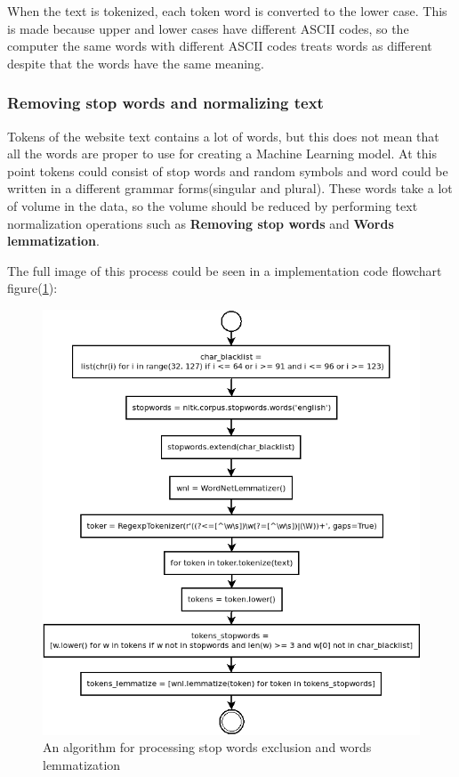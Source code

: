 When the text is tokenized, each token word is converted to the lower case. This is made because upper and lower cases have different ASCII codes, so the computer the same words with different ASCII codes treats words as different despite that the words have the same meaning.

\subsubsection{Removing stop words and normalizing text}

\label{sec:stopWords}

Tokens of the website text contains a lot of words, but this does not mean that all the words are proper to use for creating a Machine Learning model. At this point tokens could consist of stop words and random symbols and word could be written in a different grammar forms(singular and plural). These words take a lot of volume in the data, so the volume should be reduced by performing text normalization operations such as \textbf{Removing stop words} and \textbf{Words lemmatization}.


The full image of this process could be seen in a implementation code flowchart figure(\ref{fig:stop_lemma_text}):
\begin{figure}[H]
    \centering
    \includegraphics[width=1\textwidth]{Pictures/stop_lemma_text.png}
    \caption{\label{fig:stop_lemma_text}{} An algorithm for processing stop words exclusion and words lemmatization }
\end{figure}

